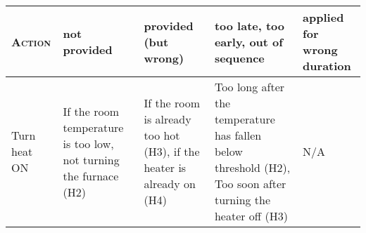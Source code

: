 \begin{tabular}{|p{1.5cm}|p{2cm}|p{2cm}|p{2cm}|p{2cm}|}
\hline
\textsc{Action}&\textbf{not \mbox{provided}}&\textbf{provided (but wrong)}&\textbf{too late, too early, out of sequence}&\textbf{applied for wrong duration}\\
\hline
Turn heat ON&If the room temperature is too low, not turning the furnace (H2)&If the room is already too hot (H3), if the heater is already on (H4)&Too long after the temperature has fallen below threshold (H2), Too soon after turning the heater off (H3)&N/A\\
\hline
\end{tabular}
\vspace{1em}

